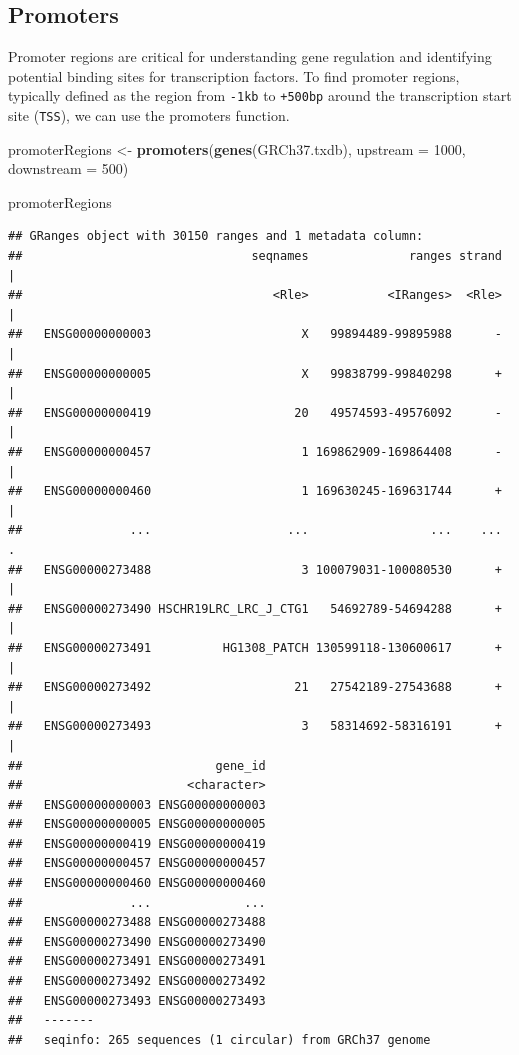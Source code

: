 \documentclass[
]{book}
\newenvironment{Shaded}{\begin{snugshade}}{\end{snugshade}}
\newcommand{\AttributeTok}[1]{\textcolor[rgb]{0.13,0.29,0.53}{#1}}
\newcommand{\DecValTok}[1]{\textcolor[rgb]{0.00,0.00,0.81}{#1}}
\newcommand{\FunctionTok}[1]{\textcolor[rgb]{0.13,0.29,0.53}{\textbf{#1}}}
\newcommand{\NormalTok}[1]{#1}
\newcommand{\OtherTok}[1]{\textcolor[rgb]{0.56,0.35,0.01}{#1}}
\begin{document}
\hypertarget{promoters}{%
\subsection{Promoters}\label{promoters}}

Promoter regions are critical for understanding gene regulation and identifying potential binding sites for transcription factors. To find promoter regions, typically defined as the region from \texttt{-1kb} to \texttt{+500bp} around the transcription start site (\texttt{TSS}), we can use the promoters function.

\begin{Shaded}
\begin{Highlighting}[]
\NormalTok{promoterRegions }\OtherTok{\textless{}{-}} \FunctionTok{promoters}\NormalTok{(}\FunctionTok{genes}\NormalTok{(GRCh37.txdb), }
                             \AttributeTok{upstream =} \DecValTok{1000}\NormalTok{, }
                             \AttributeTok{downstream =} \DecValTok{500}\NormalTok{)}

\NormalTok{promoterRegions}
\end{Highlighting}
\end{Shaded}

\begin{verbatim}
## GRanges object with 30150 ranges and 1 metadata column:
##                                seqnames              ranges strand |
##                                   <Rle>           <IRanges>  <Rle> |
##   ENSG00000000003                     X   99894489-99895988      - |
##   ENSG00000000005                     X   99838799-99840298      + |
##   ENSG00000000419                    20   49574593-49576092      - |
##   ENSG00000000457                     1 169862909-169864408      - |
##   ENSG00000000460                     1 169630245-169631744      + |
##               ...                   ...                 ...    ... .
##   ENSG00000273488                     3 100079031-100080530      + |
##   ENSG00000273490 HSCHR19LRC_LRC_J_CTG1   54692789-54694288      + |
##   ENSG00000273491          HG1308_PATCH 130599118-130600617      + |
##   ENSG00000273492                    21   27542189-27543688      + |
##   ENSG00000273493                     3   58314692-58316191      + |
##                           gene_id
##                       <character>
##   ENSG00000000003 ENSG00000000003
##   ENSG00000000005 ENSG00000000005
##   ENSG00000000419 ENSG00000000419
##   ENSG00000000457 ENSG00000000457
##   ENSG00000000460 ENSG00000000460
##               ...             ...
##   ENSG00000273488 ENSG00000273488
##   ENSG00000273490 ENSG00000273490
##   ENSG00000273491 ENSG00000273491
##   ENSG00000273492 ENSG00000273492
##   ENSG00000273493 ENSG00000273493
##   -------
##   seqinfo: 265 sequences (1 circular) from GRCh37 genome
\end{verbatim}
\end{document}
